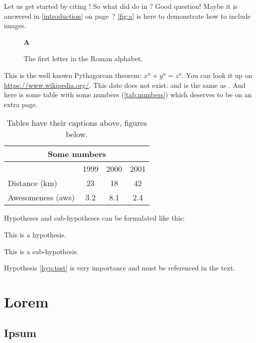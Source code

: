 Let us get started by citing \cite{BeckKKF13}!
So what did \citeauthor{BeckKKF13} do in \citeyear{BeckKKF13}?
Good question!
Maybe it is answered in \cref{introduction} on page~\pageref{introduction}?
\autoref{fig:a} is here to demonstrate how to include images.
\begin{figure}[bt]%
  \begin{center}{\huge\bfseries A}\end{center}
  \caption{The first letter in the Roman alphabet.}\label{fig:a}
\end{figure}
This is the well known Pythagorean theorem: $x^n + y^n = z^n$.
You can look it up on \url{https://www.wikipedia.org/}.
This date does not exist: 
and is the same as .
And here is some table with some numbers (\autoref{tab:numbers})
which deserves to be on an extra page.

\begin{table}[p]%
  \caption{Tables have their captions above, figures below.}
  \begin{center}
    \begin{tabular}{lccc}\toprule
      \multicolumn{4}{c}{Some numbers}       \\\midrule
                        & 1999 & 2000 & 2001 \\\cmidrule(l){2-4}
      Distance (km)     & 23   & 18   & 42   \\
      Awesomeness (aws) & 3.2  & 8.1  & 2.4  \\\bottomrule
    \end{tabular}
  \end{center}\label{tab:numbers}%
\end{table}

Hypotheses and sub-hypotheses can be formulated like this:
\begin{hypothesis}
\label{hyp:test}
This is a hypothesis.
\end{hypothesis}
\begin{shypothesis}
\label{shyp:test}
This is a sub-hypothesis.
\end{shypothesis}
Hypothesis \cref{hyp:test} is very importance and must be referenced in the text.

\section{Lorem} \label{sec:lorem}
\lipsum[1-3]

\subsection{Ipsum} \label{ssec:ipsum}
\lipsum[4-7]
